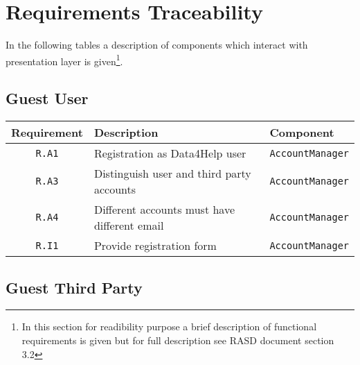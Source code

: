 \documentclass[../DD0.tex]{subfiles}
\begin{document}
\def \AccountManager {\texttt{AccountManager}}
\def \DataCollector {\texttt{DataCollector}}
\def \EmergencyDetector {\texttt{EmergencyDetector}}
\def \PaymentGateway {\texttt{PaymentGateway}}
\def \NotificationManager {\texttt{NotificationManager}}
\def \EmergencyDispatcher {\texttt{EmergencyDispatcher}}
\def \FilterManager {\texttt{FilterManager}}
\def \RequestManager {\texttt{RequestManager}}
\def \SetBuilder {\texttt{SetBuilder}}
\section{Requirements Traceability}
\label{sec:req}
In the following tables a description of components which interact with presentation layer is given\footnote{In this section for readibility purpose a brief description of functional requirements is given but for full description see RASD document section 3.2}.
\subsection{Guest User}

    \begin{table}[h!]

      \centering
      \begin{tabularx}{\linewidth}{|c|X|l|}
        \hline
        \textbf{Requirement} & \textbf{Description} & \textbf{Component} \\ \hline
        \texttt{R.A1} & Registration as Data4Help user &\texttt{\AccountManager} \\
        \hline
        \texttt{R.A3} & Distinguish user and third party accounts & \texttt{\AccountManager} \\
        \hline
        \texttt{R.A4} & Different accounts must have different email & \texttt{\AccountManager} \\
        \hline
        \texttt{R.I1} & Provide registration form  & \texttt{\AccountManager} \\
        \hline
      \end{tabularx}
      \label{tab:guestuser}

    \end{table}


\subsection{Guest Third Party}
\end{document}

